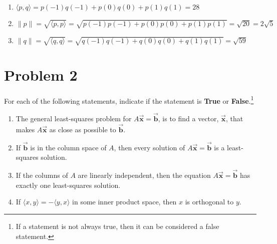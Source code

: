 \documentclass[letter,11pt]{article}
\theoremstyle{definition}
\begin{document}
\begin{tcolorbox}[boxrule=1mm,enhanced jigsaw, breakable,before=\hfill,after=\hfill,adjusted title={Problem 1 solutions}]

\begin{enumerate}[label = \roman*.]
    \item $\langle p, q\rangle=p\left(-1\right)q\left(-1\right)+p\left(0\right)q\left(0\right)+p\left(1\right)q\left(1\right) = 28$
    \item $\|p\| = \sqrt{\langle p, p\rangle} = \sqrt{p\left(-1\right)p\left(-1\right)+p\left(0\right)p\left(0\right)+p\left(1\right)p\left(1\right)}= \sqrt{20} = 2 \sqrt{5}$
    \item $\|q\| = \sqrt{\langle q, q\rangle} = \sqrt{q\left(-1\right)q\left(-1\right)+q\left(0\right)q\left(0\right)+q\left(1\right)q\left(1\right)} = \sqrt{59}$
\end{enumerate}
        
\end{tcolorbox}

\section{Problem 2}
For each of the following statements, indicate if the statement is \textbf{True} or \textbf{False}.\footnote{If a statement is not always true, then it can be considered a false statement.}

\begin{enumerate}[label = \roman*.]
    \item The general least-squares problem for $A \vec{\boldsymbol{x}}=\vec{\boldsymbol{b}}$, is to find a vector, $\vec{\boldsymbol{x}}$, that makes $A \vec{\boldsymbol{x}}$ as close as possible to $\vec{\boldsymbol{b}}$.
    \item If $\vec{\boldsymbol{b}}$ is in the column space of $A$, then every solution of $A \vec{\boldsymbol{x}}=\vec{\boldsymbol{b}}$ is a least-squares solution.
    \item If the columns of $A$ are linearly independent, then the equation $A \vec{\boldsymbol{x}}=\vec{\boldsymbol{b}}$ has exactly one least-squares solution.
    \item If $\langle x, y\rangle=-\langle y, x\rangle$ in some inner product space, then $x$ is orthogonal to $y$.
\end{enumerate}
\end{document}
